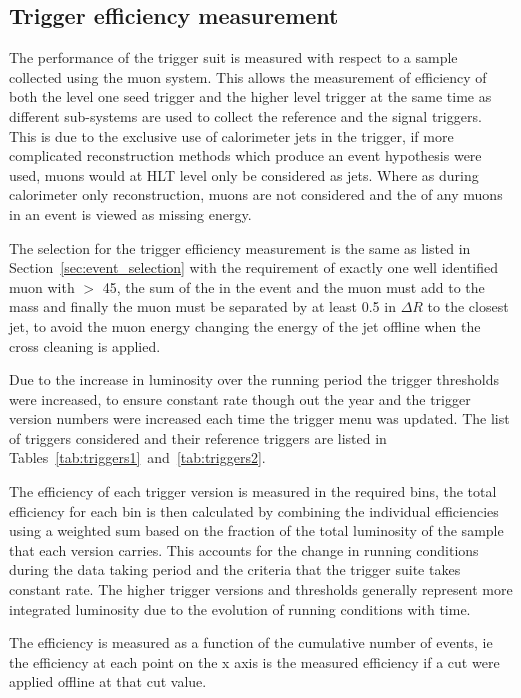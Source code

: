 \subsection{Trigger efficiency measurement} %
\label{sub:trigger_efficiency_measurement}

The performance of the \alt trigger suit is measured with respect to a sample 
collected using the muon system. This allows the measurement of efficiency of 
both the level one seed trigger and the higher level trigger at the same time 
as different sub-systems are used to collect the reference and the signal 
triggers. This is due to the exclusive use of calorimeter jets in the \alt 
trigger, if more complicated reconstruction methods which produce an event 
hypothesis were used, muons would at HLT level only be considered as jets. 
Where as during calorimeter only reconstruction, muons are not considered and 
the \pt of any muons in an event is viewed as missing energy.

The selection for the trigger efficiency measurement is the same as listed in 
Section~\ref{sec:event_selection} with the requirement of exactly one well 
identified muon with \PT $>$ \unit{45}{\GeV}, the sum of the \MET in the event 
and the muon must add to the \PW mass and finally the muon must be separated by 
at least 0.5 in $\Delta R$ to the closest jet, to avoid the muon energy 
changing the energy of the jet offline when the cross cleaning is applied.

Due to the increase in luminosity over the running period the trigger 
thresholds were increased, to ensure constant rate though out the year and the 
trigger version numbers were increased each time the trigger menu was updated.
The list of triggers considered and their reference triggers are listed in 
Tables~\ref{tab:triggers1}~and~\ref{tab:triggers2}.

The efficiency of each trigger version is measured in the required \HT bins, 
the total efficiency for each \HT bin is then calculated by combining the 
individual efficiencies using a weighted sum based on the fraction of 
the total luminosity of the sample that each version carries. This accounts for 
the change in running conditions during the data taking period and the criteria 
that the trigger suite takes constant rate. The higher trigger versions and thresholds generally represent more integrated luminosity due to the evolution of running conditions with time.

The efficiency is measured as a function of the cumulative number of events, ie the efficiency at each point on the x axis is the measured efficiency if a cut were applied offline at that cut value.




